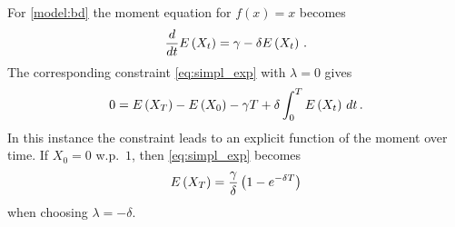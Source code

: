 \begin{example}
For \autoref{model:bd} the moment equation for $f(x)=x$ becomes
	\[
		\frac{d}{dt}{E}\left(X_t\right)=\gamma - \delta{E}\left(X_t\right)\,.
	\]
The corresponding constraint \eqref{eq:simpl_exp} with $\lambda=0$ gives
	\[
		0={E}\left(X_T\right) - {E}\left(X_0\right) - \gamma T + \delta \int_0^{T} {E}\left(X_t\right)\,dt\,.
	\]
In this instance the constraint  leads to an explicit function of
the moment over time. If  $X_0=0$ w.p.\ $1$, then \eqref{eq:simpl_exp} becomes
\begin{equation}\label{eq:bd_constraint}
{E}\left(X_T\right) = \frac{\gamma}{\delta} \left(1 - e^{-\delta T}\right)
\end{equation}
when choosing $\lambda=-\delta$.
\end{example}


